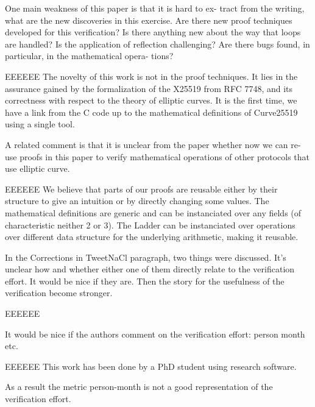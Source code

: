 One main weakness of this paper is that it is hard to ex-
tract from the writing, what are the new discoveries in this
exercise. Are there new proof techniques developed for this
verification? Is there anything new about the way that loops
are handled? Is the application of reflection challenging? Are
there bugs found, in particular, in the mathematical opera-
tions?

\begin{answer}{EEEEEE}
The novelty of this work is not in the proof techniques. It
lies in the assurance gained by the formalization of the
X25519 from RFC 7748, and its correctness with respect to
the theory of elliptic curves. It is the first time, we have a
link from the C code up to the mathematical definitions of
Curve25519 using a single tool.
\end{answer}

A related comment is that it is unclear from the paper
whether now we can re-use proofs in this paper to verify
mathematical operations of other protocols that use elliptic
curve.

\begin{answer}{EEEEEE}
We believe that parts of our proofs are reusable either by
their structure to give an intuition or by directly changing
some values. The mathematical definitions are generic and
can be instanciated over any fields (of characteristic neither
2 or 3). The Ladder can be instanciated over operations
over different data structure for the underlying arithmetic,
making it reusable.
\end{answer}

In the Corrections in TweetNaCl paragraph, two things
were discussed. It’s unclear how and whether either one of
them directly relate to the verification effort. It would be nice
if they are. Then the story for the usefulness of the verification
become stronger.

\begin{answer}{EEEEEE}
\end{answer}

It would be nice if the authors comment on the verification
effort: person month etc.

\begin{answer}{EEEEEE}
This work has been done by a PhD student using research software.

As a result the metric person-month is not a good representation of the verification effort.
\end{answer}

